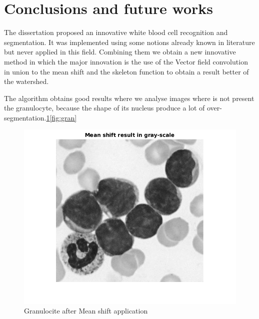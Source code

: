 \section{Conclusions and future works}
The dissertation proposed an innovative white blood cell recognition and segmentation. It was implemented using some notions already known in literature but never applied in this field. Combining them we obtain a new innovative method in which the major innovation is the use of the Vector field convolution in union to the mean shift and the skeleton function to obtain a result better of the watershed.

\bigskip

The algorithm obtains good results where we analyse images where is not present the granulocyte, because the shape of its nucleus produce a lot of over-segmentation.\ref{fig:grangray}\ref{fig:gran}
\begin{figure}
\begin{center}
		\includegraphics[scale=0.5]{img/final/meangran.png}
		\caption{Granulocite after Mean shift application}
		\label{fig:grangray}
\end{center}
\end{figure}
